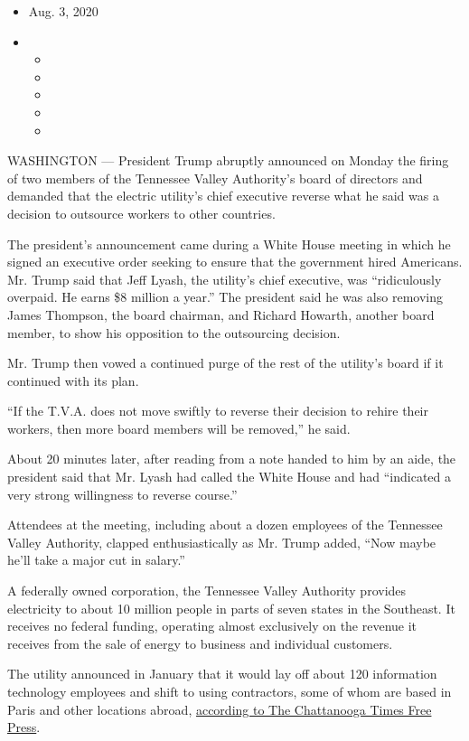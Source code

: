 \begin{itemize}
\item
  Aug. 3, 2020
\item
  \begin{itemize}
  \item
  \item
  \item
  \item
  \item
  \end{itemize}
\end{itemize}

WASHINGTON --- President Trump abruptly announced on Monday the firing
of two members of the Tennessee Valley Authority's board of directors
and demanded that the electric utility's chief executive reverse what he
said was a decision to outsource workers to other countries.

The president's announcement came during a White House meeting in which
he signed an executive order seeking to ensure that the government hired
Americans. Mr. Trump said that Jeff Lyash, the utility's chief
executive, was ``ridiculously overpaid. He earns \$8 million a year.''
The president said he was also removing James Thompson, the board
chairman, and Richard Howarth, another board member, to show his
opposition to the outsourcing decision.

Mr. Trump then vowed a continued purge of the rest of the utility's
board if it continued with its plan.

``If the T.V.A. does not move swiftly to reverse their decision to
rehire their workers, then more board members will be removed,'' he
said.

About 20 minutes later, after reading from a note handed to him by an
aide, the president said that Mr. Lyash had called the White House and
had ``indicated a very strong willingness to reverse course.''

Attendees at the meeting, including about a dozen employees of the
Tennessee Valley Authority, clapped enthusiastically as Mr. Trump added,
``Now maybe he'll take a major cut in salary.''

A federally owned corporation, the Tennessee Valley Authority provides
electricity to about 10 million people in parts of seven states in the
Southeast. It receives no federal funding, operating almost exclusively
on the revenue it receives from the sale of energy to business and
individual customers.

The utility announced in January that it would lay off about 120
information technology employees and shift to using contractors, some of
whom are based in Paris and other locations abroad,
\href{https://www.timesfreepress.com/news/business/aroundregion/story/2020/jan/28/tvcuts-120-jobs-it-it-outsources-software-wor/514284/}{according
to The Chattanooga Times Free Press}.

